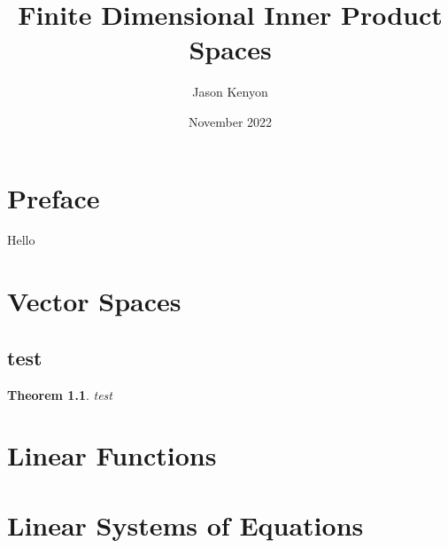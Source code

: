 \documentclass[oneside, 12pt]{book}
\title{Finite Dimensional Inner Product Spaces}
\author{Jason Kenyon}
\date{November 2022}
\newtheorem{thm}{Theorem}[section]
\theoremstyle{definition}
\begin{document}
\frontmatter
\maketitle
\cleardoublepage
{}
\tableofcontents
\chapter*{Preface}
Hello
\mainmatter
\chapter{Vector Spaces}
\section{test}
\begin{thm}
test
\end{thm}
\chapter{Linear Functions}
\chapter{Linear Systems of Equations}
\end{document}
